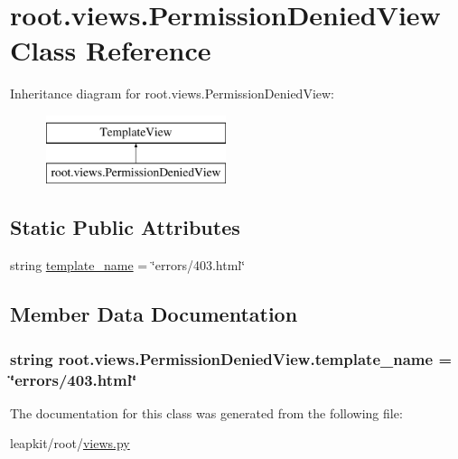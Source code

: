 \hypertarget{classroot_1_1views_1_1_permission_denied_view}{\section{root.\-views.\-Permission\-Denied\-View Class Reference}
\label{classroot_1_1views_1_1_permission_denied_view}
}
Inheritance diagram for root.\-views.\-Permission\-Denied\-View\-:\begin{figure}[H]
\begin{center}
\leavevmode
\includegraphics[height=2.000000cm]{classroot_1_1views_1_1_permission_denied_view}
\end{center}
\end{figure}
\subsection*{Static Public Attributes}
\begin{DoxyCompactItemize}
\item 
string \hyperlink{classroot_1_1views_1_1_permission_denied_view_a3d9c321bfd44d06d2447fbf718c246de}{template\-\_\-name} = \char`\"{}errors/403.html\char`\"{}
\end{DoxyCompactItemize}


\subsection{Member Data Documentation}
\hypertarget{classroot_1_1views_1_1_permission_denied_view_a3d9c321bfd44d06d2447fbf718c246de}{
\subsubsection[{template\-\_\-name}]{\setlength{\rightskip}{0pt plus 5cm}string root.\-views.\-Permission\-Denied\-View.\-template\-\_\-name = \char`\"{}errors/403.html\char`\"{}\hspace{0.3cm}{\ttfamily [static]}}}\label{classroot_1_1views_1_1_permission_denied_view_a3d9c321bfd44d06d2447fbf718c246de}


The documentation for this class was generated from the following file\-:\begin{DoxyCompactItemize}
\item 
leapkit/root/\hyperlink{root_2views_8py}{views.\-py}\end{DoxyCompactItemize}
